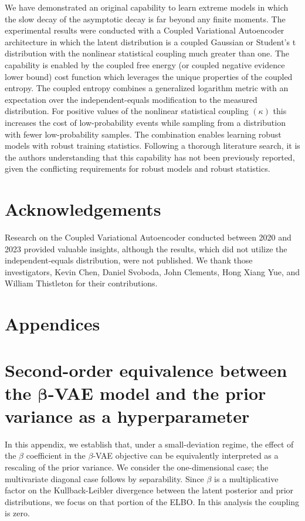 \documentclass[twoside,11pt]{article}
\begin{document}
We have demonstrated an original capability to learn extreme models in which the slow decay of the asymptotic decay is far beyond any finite moments. The experimental results were conducted with a Coupled Variational Autoencoder architecture in which the latent distribution is a coupled Gaussian or Student's t distribution with the nonlinear statistical coupling much greater than one. The capability is enabled by the coupled free energy (or coupled negative evidence lower bound) cost function which leverages the unique properties of the coupled entropy. The coupled entropy combines a generalized logarithm metric with an expectation over the independent-equals modification to the measured distribution. For positive values of the nonlinear statistical coupling $(\kappa)$ this increases the cost of low-probability events while sampling from a distribution with fewer low-probability samples. The combination enables learning robust models with robust training statistics. Following a thorough literature search, it is the authors understanding that this capability has not been previously reported, given the conflicting requirements for robust models and robust statistics.

\section*{Acknowledgements}
Research on the Coupled Variational Autoencoder conducted between 2020 and 2023 provided valuable insights, although the results, which did not utilize the independent-equals distribution, were not published. We thank those investigators, Kevin Chen, Daniel Svoboda, John Clements, Hong Xiang Yue, and William Thistleton for their contributions.

\section*{Appendices}
\appendix

\section[Second-order equivalence between the beta-VAE model and prior variance as a hyperparameter]
{Second-order equivalence between the $\boldsymbol{\beta}$-VAE model and the prior variance as a hyperparameter}

In this appendix, we establish that, under a small-deviation regime, the effect of the $\beta$ coefficient in the $\beta$-VAE objective can be equivalently interpreted as a rescaling of the prior variance. We consider the one-dimensional case; the multivariate diagonal case follows by separability. Since $\beta$ is a multiplicative factor on the Kullback-Leibler divergence between the latent posterior and prior distributions, we focus on that portion of the ELBO. In this analysis the coupling is zero.
\end{document}
